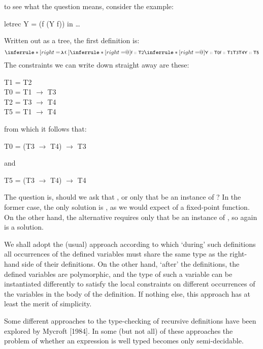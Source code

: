 to see what the question means, consider the example:
\begin{mlcoded}
    letrec Y = (f (Y f)) in \ldots
\end{mlcoded}
Written out as a tree, the first definition is:
\[
\inferrule*[right={\!\textnormal{\ml{\tlb{f}}}}]
{
    \inferrule*[right={\!\!@}]
    {
        {\text{\ml{f \hastype{} T2}}}
        \\
        \inferrule*[right={\!\!@}]
        {
            {\text{\ml{Y \hastype{} T0}}}
            \\
            {\text{\ml{f \hastype{} T1}}}
        }
        {\text{\ml{T3}}}
    }
    {\text{\ml{T4}}}
}
{
    \text{\ml{Y \hastype{} T5}}
}
\]
The constraints we can write down straight away are these:
\begin{mlcoded}
    T1 = T2 \\
    T0 = T1 $\rightarrow$ T3 \\
    T2 = T3 $\rightarrow$ T4 \\
    T5 = T1 $\rightarrow$ T4
\end{mlcoded}
from which it follows that:
\begin{mlcoded}
    T0 = (T3 $\rightarrow$ T4) $\rightarrow$ T3
\end{mlcoded}
and
\begin{mlcoded}
    T5 = (T3 $\rightarrow$ T4) $\rightarrow$ T4
\end{mlcoded}
The question is, should we ask that , or only that  be an instance
of ? In the former case, the only solution is ,
as we would expect of a fixed-point function. On the other hand,
the alternative requires only that  be an instance of , so again
 is a solution.

We shall adopt the (usual) approach according to which `during' such
definitions all occurrences of the defined variables must share the same type as
the right-hand side of their definitions. On the other hand, `after' the
definitions, the defined variables are polymorphic, and the type of such a
variable can be instantiated differently to satisfy the local constraints on
different occurrences of the variables in the body of the definition. If nothing
else, this approach has at least the merit of simplicity.

Some different approaches to the type-checking of recursive definitions
have been explored by Mycroft [1984]. In some (but not all) of these
approaches the problem of whether an expression is well typed becomes only
semi-decidable.

